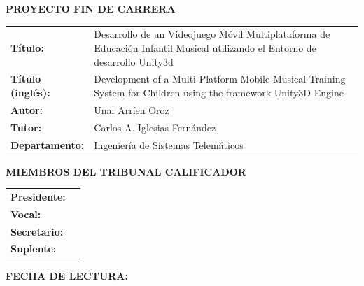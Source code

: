 \cleardoublepage
\thispagestyle{empty}
\vspace*{3\baselineskip}
{\large{\bf PROYECTO FIN DE CARRERA}}
\vspace{0.5cm}

\begin{rm}
\begin{tabular}{p{3cm}p{10cm}}
\textbf{Título:} & Desarrollo de un Videojuego Móvil Multiplataforma de Educación Infantil Musical utilizando el Entorno de desarrollo Unity3d\\ 
\textbf{Título (inglés):} & Development of a Multi-Platform Mobile Musical Training System for Children using the framework Unity3D Engine\\ 
\textbf{Autor:} & Unai Arríen Oroz \\ 
\textbf{Tutor:} & Carlos A. Iglesias Fernández\\ 
\textbf{Departamento:} & Ingeniería de Sistemas Telemáticos \\ 
\end{tabular} \end{rm} \vspace{1cm}

{\large{\bf MIEMBROS DEL TRIBUNAL CALIFICADOR}} \vspace{0.5cm}

\begin{rm}
\begin{tabular}{p{3cm}p{10cm}}
\textbf{Presidente:} & \\
\textbf{Vocal:} & \\
\textbf{Secretario:} & \\
\textbf{Suplente:} & 
\end{tabular}
\end{rm}
\vspace{1cm}

{\large{\bf FECHA DE LECTURA:}}
\vspace{1cm}

